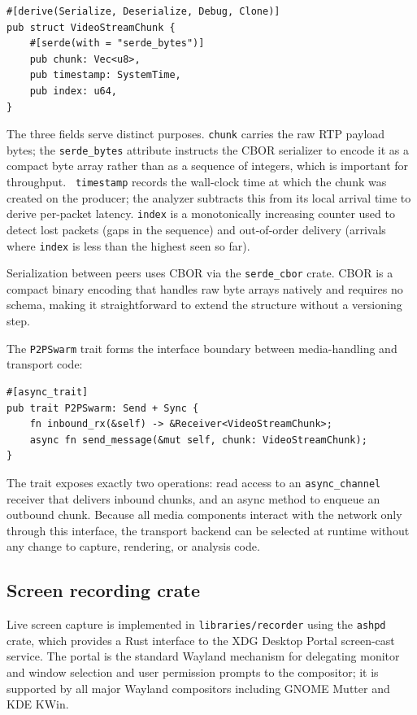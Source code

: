 \begin{Verbatim}[samepage=true]
#[derive(Serialize, Deserialize, Debug, Clone)]
pub struct VideoStreamChunk {
    #[serde(with = "serde_bytes")]
    pub chunk: Vec<u8>,
    pub timestamp: SystemTime,
    pub index: u64,
}
\end{Verbatim}

The three fields serve distinct purposes. \texttt{chunk} carries the raw \ac{RTP} payload bytes; the \texttt{serde\_bytes} attribute instructs the CBOR serializer to encode it as a compact byte array rather than as a sequence of integers, which is important for throughput.~\cite{bormannConciseBinaryObject2020} \texttt{timestamp} records the wall-clock time at which the chunk was created on the producer; the analyzer subtracts this from its local arrival time to derive per-packet latency. \texttt{index} is a monotonically increasing counter used to detect lost packets (gaps in the sequence) and out-of-order delivery (arrivals where \texttt{index} is less than the highest seen so far).

Serialization between peers uses CBOR via the \texttt{serde\_cbor} crate. CBOR is a compact binary encoding that handles raw byte arrays natively and requires no schema, making it straightforward to extend the structure without a versioning step.~\cite{bormannConciseBinaryObject2020}

The \texttt{P2PSwarm} trait forms the interface boundary between media-handling and transport code:

\begin{Verbatim}[samepage=true]
#[async_trait]
pub trait P2PSwarm: Send + Sync {
    fn inbound_rx(&self) -> &Receiver<VideoStreamChunk>;
    async fn send_message(&mut self, chunk: VideoStreamChunk);
}
\end{Verbatim}

The trait exposes exactly two operations: read access to an \texttt{async\_channel} receiver that delivers inbound chunks, and an async method to enqueue an outbound chunk. Because all media components interact with the network only through this interface, the transport backend can be selected at runtime without any change to capture, rendering, or analysis code.

\subsection{Screen recording crate}
\label{sec:recorder_crate}
Live screen capture is implemented in \texttt{libraries/recorder} using the \texttt{ashpd} crate, which provides a Rust interface to the XDG Desktop Portal screen-cast service. The portal is the standard Wayland mechanism for delegating monitor and window selection and user permission prompts to the compositor; it is supported by all major Wayland compositors including GNOME Mutter and KDE KWin.


